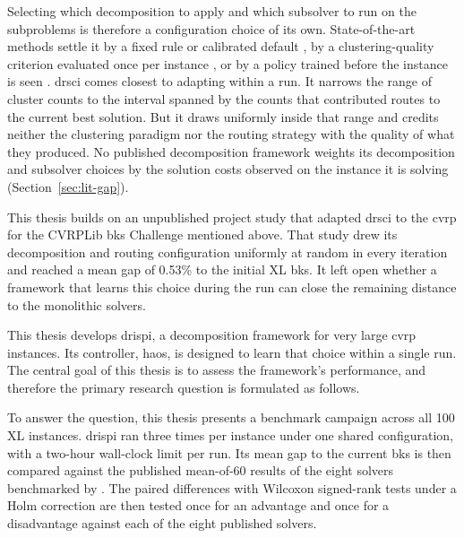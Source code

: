 Selecting which decomposition to apply and which subsolver to run on the subproblems is therefore a configuration choice of its own.
State-of-the-art methods settle it by a fixed rule or calibrated default \citep{queirogaPOPMUSICMatheuristic2021,santiniDecompositionStrategiesVehicle2023}, by a clustering-quality criterion evaluated once per instance \citep{kerscherDecomposerouteimproveFrameworkSolving2025}, or by a policy trained before the instance is seen \citep{liLearningDelegate2021,yeGLOP2024}. \gls{drsci} comes closest to adapting within a run.
It narrows the range of cluster counts to the interval spanned by the counts that contributed routes to the current best solution. But it draws uniformly inside that range and credits neither the clustering paradigm nor the routing strategy with the quality of what they produced. No published decomposition framework weights its decomposition and subsolver choices by the solution costs observed on the instance it is solving (Section~\ref{sec:lit-gap}).

This thesis builds on an unpublished project study that adapted \gls{drsci} to the \gls{cvrp} \citep{altendeiteringDRSCICVRP2026} for the CVRPLib \gls{bks} Challenge mentioned above. That study drew its decomposition and routing configuration uniformly at random in every iteration and reached a mean gap of 0.53\% to the initial XL \gls{bks}\@.
It left open whether a framework that learns this choice during the run can close the remaining distance to the monolithic solvers.

This thesis develops \gls{drispi}, a decomposition framework for very large \gls{cvrp} instances. Its controller, \gls{haos}, is designed to learn that choice within a single run. The central goal of this thesis is to assess the framework's performance, and therefore the primary research question is formulated as follows.


To answer the question, this thesis presents a benchmark campaign across all 100 XL instances. \gls{drispi} ran three times per instance under one shared configuration, with a two-hour wall-clock limit per run.
Its mean gap to the current \gls{bks} is then compared against the published mean-of-60 results of the eight solvers benchmarked by \citet{queirogaXLInstancesCapacitated2026}.
The paired differences with Wilcoxon signed-rank tests \citep{wilcoxonIndividualComparisonsRanking1945} under a Holm correction \citep{holmSimpleSequentiallyRejective1979} are then tested once for an advantage and once for a disadvantage against each of the eight published solvers.

